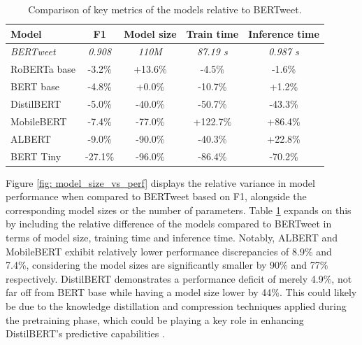 \begin{table}
    \small
    \centering
    \begin{tabularx}{\textwidth}{|X|c|c|c|c|}
        \hline
        \rowcolor[gray]{0.7}
        \textbf{Model} & \textbf{F1} & \textbf{Model size} & \textbf{Train time} & \textbf{Inference time} \\
        \hline
        \textit{BERTweet}       & \textit{0.908}       & \textit{110M}                & \textit{87.19 s}             & \textit{0.987 s}                 \\
        \hline
        RoBERTa base   & -3.2\%      & +13.6\%             & -4.5\%              & -1.6\%                  \\
        \rowcolor[gray]{0.9}
        BERT base      & -4.8\%      & +0.0\%              & -10.7\%             & +1.2\%                  \\
        DistilBERT     & -5.0\%      & -40.0\%             & -50.7\%             & -43.3\%                 \\
        \rowcolor[gray]{0.9}
        MobileBERT     & -7.4\%      & -77.0\%             & +122.7\%            & +86.4\%                 \\
        ALBERT         & -9.0\%      & -90.0\%             & -40.3\%             & +22.8\%                 \\
        \rowcolor[gray]{0.9}
        BERT Tiny      & -27.1\%     & -96.0\%             & -86.4\%             & -70.2\%                 \\
        \hline
    \end{tabularx}
    \caption{Comparison of key metrics of the models relative to BERTweet.}
    \label{tab: relative_comparison_metrics}
\end{table}

Figure \ref{fig: model_size_vs_perf} displays the relative variance in model performance when compared to BERTweet based on F1, alongside the corresponding model sizes or the number of parameters. Table \ref{tab: relative_comparison_metrics} expands on this by including the relative difference of the models compared to BERTweet in terms of model size, training time and inference time. Notably, ALBERT and MobileBERT exhibit relatively lower performance discrepancies of 8.9\% and 7.4\%, considering the model sizes are significantly smaller by 90\% and 77\% respectively. DistilBERT demonstrates a performance deficit of merely 4.9\%, not far off from BERT base while having a model size lower by 44\%. This could likely be due to the knowledge distillation and compression techniques applied during the pretraining phase, which could be playing a key role in enhancing DistilBERT's predictive capabilities \cite{sanhDistilBERTDistilledVersion2020}.\\

